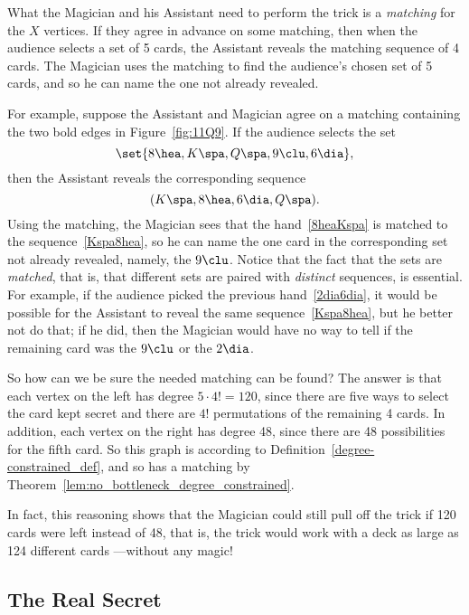What the Magician and his Assistant need to perform the trick is a
\emph{matching} for the $X$ vertices.  If they agree in advance on
some matching, then when the audience selects a set of 5 cards, the
Assistant reveals the matching sequence of 4 cards.  The Magician uses
the matching to find the audience's chosen set of 5 cards, and so he
can name the one not already revealed.

For example, suppose the Assistant and Magician agree on a matching
containing the two bold edges in Figure~\ref{fig:11Q9}.  If the
audience selects the set
\begin{equation}\label{8heaKspa}
\set{8 \hea, K \spa, Q \spa, 9 \clu, 6 \dia},
\end{equation}
then the Assistant reveals the corresponding sequence
\begin{equation}\label{Kspa8hea}
(K \spa, 8 \hea, 6 \dia, Q \spa).
\end{equation}
Using the matching, the Magician sees that the hand~\eqref{8heaKspa}
is matched to the sequence~\eqref{Kspa8hea}, so he can name the one
card in the corresponding set not already revealed, namely, the $9
\clu$.  Notice that the fact that the sets are \emph{matched}, that
is, that different sets are paired with \emph{distinct} sequences, is
essential.  For example, if the audience picked the previous
hand~\eqref{2dia6dia}, it would be possible for the Assistant to
reveal the same sequence~\eqref{Kspa8hea}, but he better not do that;
if he did, then the Magician would have no way to tell if the
remaining card was the $9 \clu$ or the $2 \dia$.

So how can we be sure the needed matching can be found?  The answer is
that each vertex on the left has degree $5 \cdot 4! = 120$, since
there are five ways to select the card kept secret and there are $4!$
permutations of the remaining 4 cards.  In addition, each vertex on
the right has degree 48, since there are 48 possibilities for the
fifth card.  So this graph is \emph{}
according to Definition~\ref{degree-constrained_def}, and so
has a matching by Theorem~\ref{lem:no_bottleneck_degree_constrained}.

In fact, this reasoning shows that the Magician could still pull off
the trick if 120 cards were left instead of 48, that is, the trick
would work with a deck as large as 124 different cards ---without any
magic!

\subsection{The Real Secret}

